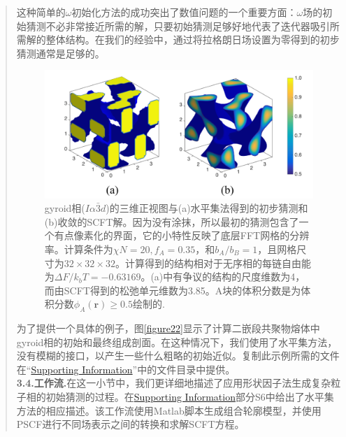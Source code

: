 \documentclass{article}
\begin{document}
\begin{CJK}{UTF8}{gkai}
\begin{quotation}
这种简单的$\omega$初始化方法的成功突出了数值问题的一个重要方面：$\omega$场的初始猜测不必非常接近所需的解，只要初始猜测足够好地代表了迭代器吸引所需解的整体结构。在我们的经验中，通过将拉格朗日场设置为零得到的初步猜测通常是足够的。
\begin{figure}[H]
	\centering
	\includegraphics[scale=0.5]{./figures/22.png}
	\caption{gyroid相($I\alpha \bar{3}d$)的三维正视图与(a)水平集法得到的初步猜测和(b)收敛的SCFT解。因为没有涂抹，所以最初的猜测包含了一个有点像素化的界面，它的小特性反映了底层FFT网格的分辨率。计算条件为$\chi N=20,f_A =0.35$，和$b_A/b_B=1$，且网格尺寸为$32\times 32\times 32$。计算得到的结构相对于无序相的每链自由能为$\Delta F /k_b T =-0.63169$。(a)中有争议的结构的尺度维数为4，而由SCFT得到的松弛单元维数为3.85。A块的体积分数是为体积分数$\phi _A(\mathbf{r})\geqslant 0.5$绘制的.
	}
	\label{figure2}
\end{figure}
为了提供一个具体的例子，图\ref{figure22}显示了计算二嵌段共聚物熔体中gyroid相的初始和最终组成剖面。在这种情况下，我们使用了水平集方法，没有模糊的接口，以产生一些什么粗略的初始近似。复制此示例所需的文件在“\href{http://pubs.acs.org/doi/suppl/10.1021/acs.macromol.6b00107/suppl_file/ma6b00107_si_001.pdf}{Supporting Information}”中的文件目录中提供。\\
\textbf{3.4.工作流.}在这一小节中，我们更详细地描述了应用形状因子法生成复杂粒子相的初始猜测的过程。在\href{http://pubs.acs.org/doi/suppl/10.1021/acs.macromol.6b00107/suppl_file/ma6b00107_si_001.pdf}{Supporting Information}部分S6中给出了水平集方法的相应描述。该工作流使用Matlab脚本生成组合轮廓模型，并使用PSCF进行不同场表示之间的转换和求解SCFT方程。
\begin{figure}[H]
	\centering

\end{figure}
\end{quotation}
\end{CJK}
\end{document}
